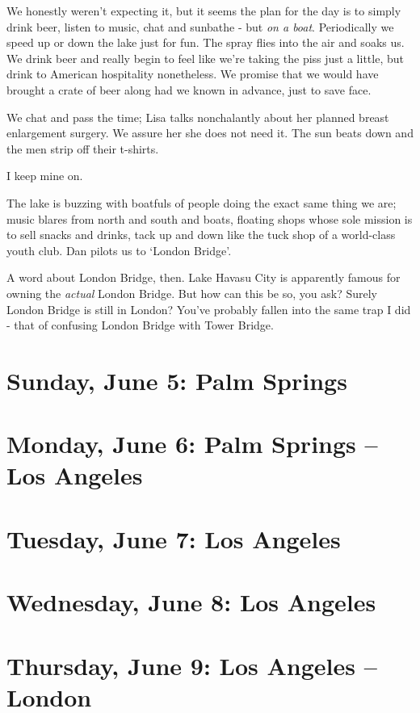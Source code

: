 \documentclass[a5paper,10pt,titlepage,draft]{book}
\begin{document}
We honestly weren't expecting it, but it seems the plan for the day is to simply drink beer, listen to music, chat and sunbathe - but \emph{on a boat}.  Periodically we speed up or down the lake just for fun.  The spray flies into the air and soaks us.  We drink beer and really begin to feel like we're taking the piss just a little, but drink to American hospitality nonetheless.  We promise that we would have brought a crate of beer along had we known in advance, just to save face.

We chat and pass the time; Lisa talks nonchalantly about her planned breast enlargement surgery.  We assure her she does not need it.  The sun beats down and the men strip off their t-shirts.

I keep mine on.

The lake is buzzing with boatfuls of people doing the exact same thing we are; music blares from north and south and boats, floating shops whose sole mission is to sell snacks and drinks, tack up and down like the tuck shop of a world-class youth club.  Dan pilots us to `London Bridge'.

A word about London Bridge, then.  Lake Havasu City is apparently famous for owning the \emph{actual} London Bridge.  But how can this be so, you ask?  Surely London Bridge is still in London?  You've probably fallen into the same trap I did - that of confusing London Bridge with Tower Bridge.


\chapter[Palm Springs]{Sunday, June 5:  Palm Springs}
\chapter[Palm Springs -- Los Angeles]{Monday, June 6:  Palm Springs -- Los Angeles}
\chapter[Los Angeles]{Tuesday, June 7:  Los Angeles}
\chapter[Los Angeles]{Wednesday, June 8: Los Angeles}
\chapter[Los Angeles -- London]{Thursday, June 9: Los Angeles -- London}
\end{document}
